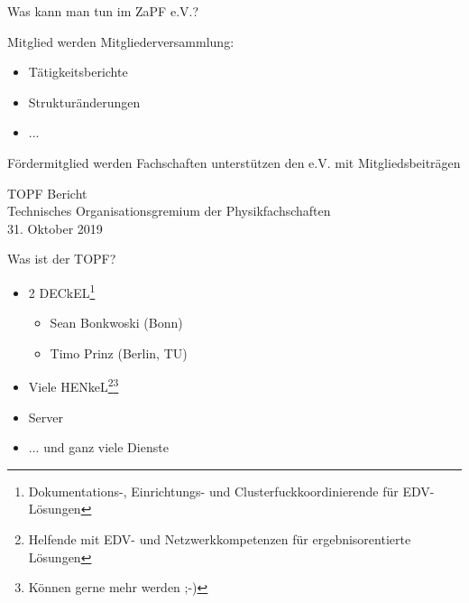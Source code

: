 \documentclass[compress, aspectratio=169]{beamer}
\begin{document}
\thispagestyle{empty}
\begin{frame}{Was kann man tun im ZaPF e.V.?}
  \begin{block}{Mitglied werden}
    Mitgliederversammlung:
    \begin{itemize}
      \item Tätigkeitsberichte
      \item Strukturänderungen
      \item ...
    \end{itemize}
  \end{block}
\pause
  \begin{block}{Fördermitglied werden}
  Fachschaften unterstützen den e.V. mit Mitgliedsbeiträgen
  \end{block}
\end{frame}

\thispagestyle{empty}
\begin{frame}
  \begin{center}
    \Large{ TOPF Bericht }\\
    \vspace{1cm}
    \large Technisches Organisationsgremium der Physikfachschaften\\
    \vspace{0.5cm}
    \normalsize 31. Oktober 2019
  \end{center}
\end{frame}

\thispagestyle{empty}
\begin{frame}{Was ist der TOPF?}
  \begin{itemize}
    \item 2 DECkEL\footnote{Dokumentations-, Einrichtungs- und Clusterfuckkoordinierende für EDV-Lösungen} 
    \begin{itemize}
      \item Sean Bonkwoski (Bonn)
      \item Timo Prinz (Berlin, TU)
    \end{itemize}
    \item Viele HENkeL\footnote{Helfende mit EDV- und Netzwerkkompetenzen für ergebnisorentierte Lösungen}\footnote{Können gerne mehr werden ;-)}
    \item Server
    \item ... und ganz viele Dienste
  \end{itemize}
\end{frame}
\end{document}
